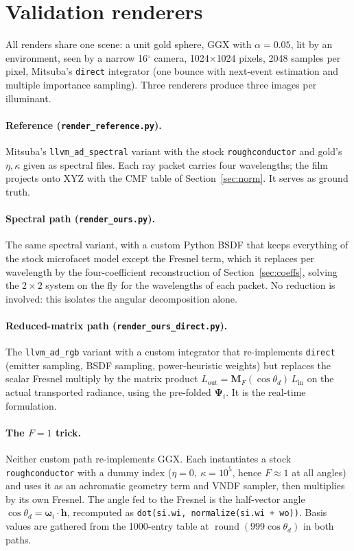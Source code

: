 \documentclass[11pt,a4paper]{article}
\newcommand{\mPsi}{\boldsymbol{\Psi}}
\newcommand{\mM}{\mathbf{M}}
\newcommand{\vh}{\mathbf{h}}
\newcommand{\wi}{\boldsymbol{\omega}_i}
\newcommand{\file}[1]{\texttt{#1}}
\newcommand{\code}[1]{\texttt{#1}}
\begin{document}
\section{Validation renderers}
\label{sec:renderers}

All renders share one scene: a unit gold sphere, GGX with $\alpha=0.05$,
lit by an environment, seen by a narrow 16$^\circ$ camera, 1024$\times$1024
pixels, 2048 samples per pixel, Mitsuba's \code{direct} integrator (one bounce
with next-event estimation and multiple importance sampling).  Three renderers
produce three images per illuminant.

\paragraph{Reference (\file{render\_reference.py}).}  Mitsuba's
\code{llvm\_ad\_spectral} variant with the stock \code{roughconductor} and
gold's $\eta,\kappa$ given as spectral files.  Each ray packet carries four
wavelengths; the film projects onto XYZ with the CMF table of
Section~\ref{sec:norm}.  It serves as ground truth.

\paragraph{Spectral path (\file{render\_ours.py}).}  The same spectral
variant, with a custom Python BSDF that keeps everything of the stock
microfacet model except the Fresnel term, which it replaces per wavelength by
the four-coefficient reconstruction of Section~\ref{sec:coeffs}, solving the
$2\times2$ system on the fly for the wavelengths of each packet.  No reduction
is involved: this isolates the angular decomposition alone.

\paragraph{Reduced-matrix path (\file{render\_ours\_direct.py}).}  The
\code{llvm\_ad\_rgb} variant with a custom integrator that re-implements
\code{direct} (emitter sampling, BSDF sampling, power-heuristic weights) but
replaces the scalar Fresnel multiply by the matrix product
$L_{\text{out}}=\mM_F(\cos\theta_d)\,L_{\text{in}}$ on the actual transported
radiance, using the pre-folded $\mPsi_i$.  It is the real-time formulation.

\paragraph{The $F{=}1$ trick.}  Neither custom path re-implements GGX.  Each
instantiates a stock \code{roughconductor} with a dummy index
($\eta=0,\ \kappa=10^5$, hence $F\approx1$ at all angles) and uses it as an
achromatic geometry term and VNDF sampler, then multiplies by its own Fresnel.
The angle fed to the Fresnel is the half-vector angle
$\cos\theta_d=\wi\!\cdot\!\vh$, recomputed as \code{dot(si.wi, normalize(si.wi + wo))}.
Basis values are gathered from the 1000-entry table at
$\operatorname{round}(999\cos\theta_d)$ in both paths.
\end{document}

